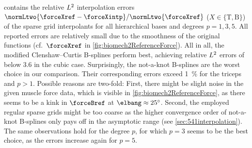  contains the relative $L^2$
interpolation errors
$\normLtwo{\forceXref - \forceXintp}/\normLtwo{\forceXref}$
($X \in \{\mathrm{T}, \mathrm{B}\}$) of the sparse grid interpolants
for all hierarchical bases and degrees $p = 1, 3, 5$.
All reported errors are relatively small
due to the smoothness of the original functions
(cf.\ $\forceXref$ in \cref{fig:biomech2ReferenceForce}).
All in all, the modified Clenshaw--Curtis B-splines perform best,
achieving relative $L^2$ errors of below \SI{3.6}{\permille}
in the cubic case.
Surprisingly, the not-a-knot B-splines are the worst choice in our
comparison.
Their corresponding errors exceed \SI{1}{\percent} for the triceps
and $p > 1$.
Possible reasons are two-fold:
First, there might be slight noise in the given muscle force data,
which is visible in \cref{fig:biomech2ReferenceForce},
as there seems to be a kink in $\forceBref$ at $\elbang \approx \ang{25}$.
Second, the employed regular sparse grids might be too coarse
as the higher convergence order of not-a-knot B-splines
only pays off in the asymptotic range (see \cref{sec:541interpolation}).
The same observations hold for the degree $p$,
for which $p = 3$ seems to be the best choice,
as the errors increase again for $p = 5$.

